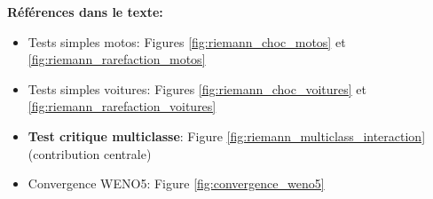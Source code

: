 \textbf{Références dans le texte:}
\begin{itemize}
\item Tests simples motos: Figures \ref{fig:riemann_choc_motos} et \ref{fig:riemann_rarefaction_motos}
\item Tests simples voitures: Figures \ref{fig:riemann_choc_voitures} et \ref{fig:riemann_rarefaction_voitures}
\item \textbf{Test critique multiclasse}: Figure \ref{fig:riemann_multiclass_interaction} (contribution centrale)
\item Convergence WENO5: Figure \ref{fig:convergence_weno5}
\end{itemize}
